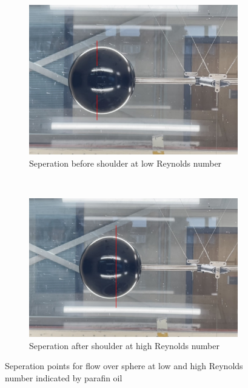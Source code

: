 \documentclass[8pt]{article}
\begin{document}
\begin{figure}[H]
    \centering
    \begin{subfigure}[t]{0.45\textwidth}
        \centering
        \includegraphics[width=1\textwidth]{Images_Videos/early_seperation_annotated.jpg}
        \caption{Seperation before shoulder at low Reynolds number}
        \label{fig:figure2}
    \end{subfigure}
    ~
    \begin{subfigure}[t]{0.48\textwidth}
        \centering
        \includegraphics[width=1\textwidth]{Images_Videos/late_seperation_annotated.jpg}
        \caption{Seperation after shoulder at high Reynolds number}
        \label{fig:figure3}
    \end{subfigure}
    \caption{Seperation points for flow over sphere at low and high Reynolds number indicated by parafin oil}
\end{figure}
\end{document}
